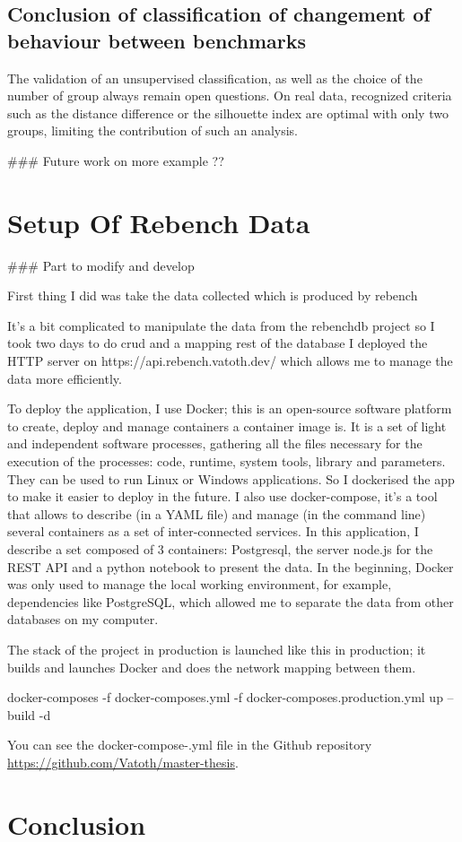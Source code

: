 \documentclass{article}
\begin{document}
\subsection{Conclusion of classification of changement of behaviour between benchmarks}

The validation of an unsupervised classification, as well as the choice of the number of group always remain open questions. On real data, recognized criteria such as the distance difference or the silhouette index are optimal with only two groups, limiting the contribution of such an analysis.

\#\#\# Future work on more example ??



\section{Setup Of Rebench Data}

\#\#\# Part to modify and develop

First thing I did was take the data collected  which is produced by rebench \cite{ReBench:2018}

It's a bit complicated to manipulate the data from the rebenchdb project so I took two days to do crud and a mapping rest of the database I deployed the HTTP server on https://api.rebench.vatoth.dev/ which allows me to manage the data more efficiently.

To deploy the application, I use Docker; this is an open-source software platform to create, deploy and manage containers a container image is. It is a set of light and independent software processes, gathering all the files necessary for the execution of the processes: code, runtime, system tools, library and parameters. They can be used to run Linux or Windows applications. So I dockerised the app to make it easier to deploy in the future. I also use docker-compose, it's a tool that allows to describe (in a YAML file) and manage (in the command line) several containers as a set of inter-connected services. In this application, I describe a set composed of 3 containers: Postgresql, the server node.js for the REST API and a python notebook to present the data. In the beginning, Docker was only used to manage the local working environment, for example, dependencies like PostgreSQL, which allowed me to separate the data from other databases on my computer.

The stack of the project in production is launched like this in production; it builds and launches Docker and does the network mapping between them.

docker-composes -f docker-composes.yml -f docker-composes.production.yml up --build -d

You can see the docker-compose-.yml file in the Github repository \url{https://github.com/Vatoth/master-thesis}. 


\section{Conclusion}


\end{document}
